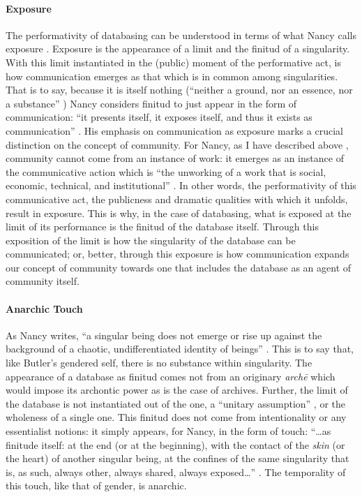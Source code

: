 
\paragraph{Exposure}
The performativity of databasing can be understood in terms of what Nancy calls exposure \parencite{Nan91:The}. Exposure is the appearance of a limit and the finitud of a singularity. With this limit instantiated in the (public) moment of the performative act, is how communication emerges as that which is in common among singularities. That is to say, because it is itself nothing (``neither a ground, nor an essence, nor a substance'' \parencite[31]{Nan91:The}) Nancy considers finitud to just appear in the form of communication: ``it presents itself, it exposes itself, and thus it exists as communication'' \parencite[31]{Nan91:The}. His emphasis on communication as exposure marks a crucial distinction on the concept of community. For Nancy, as I have described above , community cannot come from an instance of work: it emerges as an instance of the communicative action which is ``the unworking of a work that is social, economic, technical, and institutional'' \parencite[31]{Nan91:The}. In other words, the performativity of this communicative act, the publicness and dramatic qualities with which it unfolds, result in exposure. This is why, in the case of databasing, what is exposed at the limit of its performance is the finitud of the database itself. Through this exposition of the limit is how the singularity of the database can be communicated; or, better, through this exposure is how communication expands our concept of community towards one that includes the database as an agent of community itself.

\paragraph{Anarchic Touch}
As Nancy writes, ``a singular being does not emerge or rise up against the background of a chaotic, undifferentiated identity of beings'' \cite[28]{Nan91:The}. This is to say that, like Butler's gendered self, there is no substance within singularity. The appearance of a database as finitud comes not from an originary \textit{archē} which would impose its archontic power as is the case of archives. Further, the limit of the database is not instantiated out of the one, a ``unitary assumption'' \cite[28]{Nan91:The}, or the wholeness of a single one. This finitud does not come from intentionality or any essentialist notions: it simply appears, for Nancy, in the form of touch: ``\dots as finitude itself: at the end (or at the beginning), with the contact of the \textit{skin} (or the heart) of another singular being, at the confines of the same singularity that is, as such, always other, always shared, always exposed\dots'' \im \cite[28]{Nan91:The}. The temporality of this touch, like that of gender, is anarchic.

